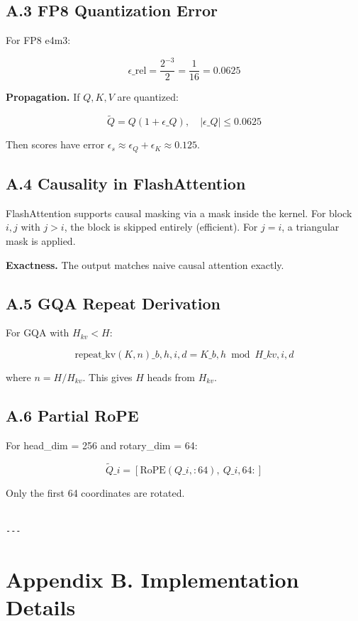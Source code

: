 \subsection{A.3 FP8 Quantization Error}

For FP8 e4m3:

\[
\epsilon\_{\text{rel}} = \frac{2^{-3}}{2} = \frac{1}{16} = 0.0625
\tag{A.6}
\]

\textbf{Propagation.} If $Q, K, V$ are quantized:

\[
\tilde{Q} = Q(1 + \epsilon\_Q), \quad |\epsilon\_Q| \leq 0.0625
\tag{A.7}
\]

Then scores have error $\epsilon_s \approx \epsilon_Q + \epsilon_K \approx 0.125$.

\subsection{A.4 Causality in FlashAttention}

FlashAttention supports causal masking via a mask inside the kernel. For 
block $i, j$ with $j > i$, the block is skipped entirely (efficient). For 
$j = i$, a triangular mask is applied.

\textbf{Exactness.} The output matches naive causal attention exactly.

\subsection{A.5 GQA Repeat Derivation}

For GQA with $H_{kv} < H$:

\[
\text{repeat\_kv}(K, n)\_{b, h, i, d} = K\_{b, h \bmod H\_{kv}, i, d}
\tag{A.8}
\]

where $n = H / H_{kv}$. This gives $H$ heads from $H_{kv}$.

\subsection{A.6 Partial RoPE}

For head\_dim = 256 and rotary\_dim = 64:

\[
\tilde{Q}\_i = [\text{RoPE}(Q\_{i, :64}), \ Q\_{i, 64:}]
\tag{A.9}
\]

Only the first 64 coordinates are rotated.
\begin{lstlisting}

---
\end{lstlisting}

\section{Appendix B. Implementation Details}

